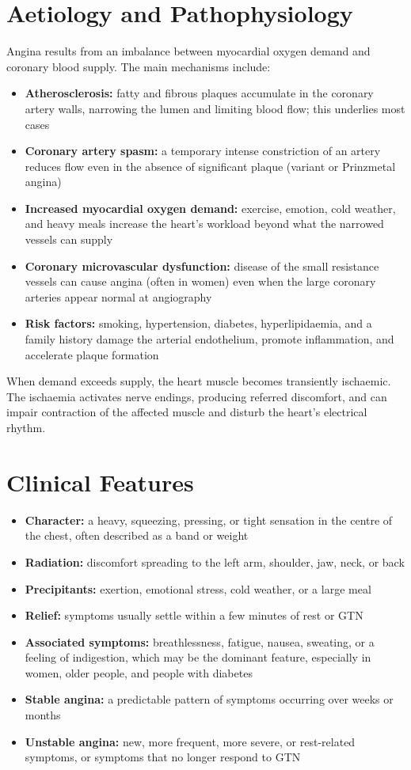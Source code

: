 \section*{Aetiology and Pathophysiology}
Angina results from an imbalance between myocardial oxygen demand and coronary blood supply. The main mechanisms include:

\begin{itemize}
    \item \textbf{Atherosclerosis:} fatty and fibrous plaques accumulate in the coronary artery walls, narrowing the lumen and limiting blood flow; this underlies most cases
    \item \textbf{Coronary artery spasm:} a temporary intense constriction of an artery reduces flow even in the absence of significant plaque (variant or Prinzmetal angina)
    \item \textbf{Increased myocardial oxygen demand:} exercise, emotion, cold weather, and heavy meals increase the heart's workload beyond what the narrowed vessels can supply
    \item \textbf{Coronary microvascular dysfunction:} disease of the small resistance vessels can cause angina (often in women) even when the large coronary arteries appear normal at angiography
    \item \textbf{Risk factors:} smoking, hypertension, diabetes, hyperlipidaemia, and a family history damage the arterial endothelium, promote inflammation, and accelerate plaque formation
\end{itemize}

When demand exceeds supply, the heart muscle becomes transiently ischaemic. The ischaemia activates nerve endings, producing referred discomfort, and can impair contraction of the affected muscle and disturb the heart's electrical rhythm.

\section*{Clinical Features}
\begin{itemize}
    \item \textbf{Character:} a heavy, squeezing, pressing, or tight sensation in the centre of the chest, often described as a band or weight
    \item \textbf{Radiation:} discomfort spreading to the left arm, shoulder, jaw, neck, or back
    \item \textbf{Precipitants:} exertion, emotional stress, cold weather, or a large meal
    \item \textbf{Relief:} symptoms usually settle within a few minutes of rest or GTN
    \item \textbf{Associated symptoms:} breathlessness, fatigue, nausea, sweating, or a feeling of indigestion, which may be the dominant feature, especially in women, older people, and people with diabetes
    \item \textbf{Stable angina:} a predictable pattern of symptoms occurring over weeks or months
    \item \textbf{Unstable angina:} new, more frequent, more severe, or rest-related symptoms, or symptoms that no longer respond to GTN
\end{itemize}

